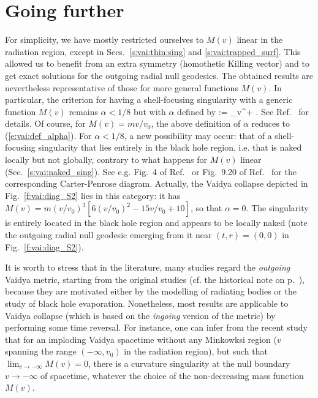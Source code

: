 

\section{Going further}

For simplicity, we have mostly restricted ourselves to $M(v)$ linear in the radiation
region, except in Secs.~\ref{s:vai:thin:sing} and \ref{s:vai:trapped_surf}.
This allowed us to benefit from an extra symmetry (homothetic Killing vector) and to get
exact solutions for the outgoing radial null geodesics.
The obtained results are nevertheless representative of those for more
general functions
$M(v)$. In particular, the criterion for having a shell-focusing singularity
with a generic function $M(v)$ remains $\alpha < 1/8$ but with $\alpha$ defined
by
\be
    \alpha := \lim_{v^+}  .
\ee
See Ref.~\cite{Kurod84,FayosT08} for details. Of course, for $M(v) = m v /v_0$, the
above definition of $\alpha$ reduces to (\ref{e:vai:def_alpha}).
For $\alpha < 1/8$, a new possibility may occur: that of a shell-focusing singularity
that lies entirely in the black hole region, i.e. that is naked locally but not globally,
contrary to what happens for $M(v)$ linear (Sec.~\ref{s:vai:naked_sing}).
See e.g. Fig.~4 of Ref.~\cite{AshteK04} or Fig.~9.20 of Ref.~\cite{GriffP09}
for the corresponding Carter-Penrose diagram.
Actually, the Vaidya collapse depicted in Fig.~\ref{f:vai:diag_S2} lies in this
category: it has $M(v) = m (v/v_0)^3 \left[ 6 (v/v_0)^2 - 15 v/v_0 + 10 \right]$,
so that $\alpha = 0$. The singularity is entirely located in the black
hole region and appears to be locally naked (note the outgoing radial null geodesic
emerging from it near $(t,r) = (0,0)$ in Fig.~\ref{f:vai:diag_S2}).

It is worth to stress that in the literature,
many studies regard the \emph{outgoing} Vaidya metric, starting from the original studies
(cf. the historical note on p.~\pageref{h:vai:origin}), because they are
motivated either by the modelling of radiating bodies or the
study of black hole evaporation. Nonetheless, most results are applicable
to Vaidya collapse (which is based on the
\emph{ingoing} version of the metric) by performing some time reversal.
For instance, one can infer from the recent study \cite{CoudrN21}
that for an imploding Vaidya spacetime without any Minkowksi region
($v$ spanning the range $(-\infty, v_0)$ in the radiation region),
but such that $\lim_{v\to -\infty} M(v) = 0$, there is a curvature singularity
at the null boundary $v\to -\infty$ of spacetime, whatever the choice of the
non-decreasing mass function $M(v)$.



